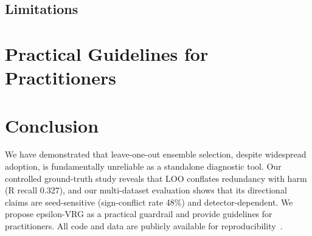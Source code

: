 \documentclass[preprint,12pt]{elsarticle}
\begin{document}
\subsection{Limitations}

\section{Practical Guidelines for Practitioners}
\label{sec:guidelines}


\section{Conclusion}
\label{sec:conclusion}

We have demonstrated that leave-one-out ensemble selection, despite widespread adoption, is fundamentally unreliable as a standalone diagnostic tool. Our controlled ground-truth study reveals that LOO conflates redundancy with harm (R recall 0.327), and our multi-dataset evaluation shows that its directional claims are seed-sensitive (sign-conflict rate 48\%) and detector-dependent. We propose epsilon-VRG as a practical guardrail and provide guidelines for practitioners. All code and data are publicly available for reproducibility~\cite{rabby2026redundancy}.



\end{document}
